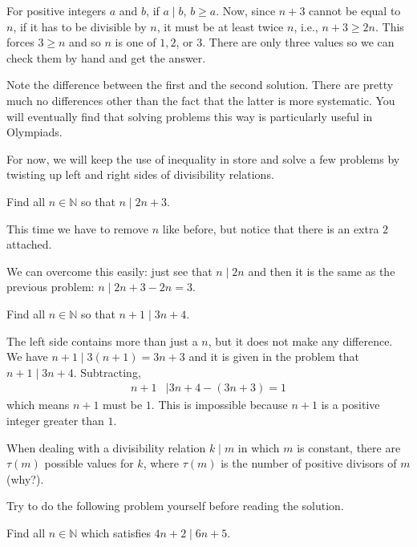 \documentclass{subfile}
\begin{document}
		\begin{solution}
			For positive integers $a$ and $b$, if $a\mid b$, $b\geq a$. Now, since $n+3$ cannot be equal to $n$, if it has to be divisible by $n$, it must be at least twice $n$, i.e., $n+3\geq2n$. This forces $3\geq n$ and so $n$ is one of $1,2$, or $3$. There are only three values so we can check them by hand and get the answer.
		\end{solution}
	Note the difference between the first and the second solution. There are pretty much no differences other than the fact that the latter is more systematic. You will eventually find that solving problems this way is particularly useful in Olympiads.

	For now, we will keep the use of inequality in store and solve a few problems by twisting up left and right sides of divisibility relations.
		\begin{problem}
			Find all $n \in \mathbb{N}$ so that $n\mid 2n+3$.
		\end{problem}

		\begin{solution}
			This time we have to remove $n$ like before, but notice that there is an extra $2$ attached.

			We can overcome this easily: just see that $n\mid 2n$ and then it is the same as the previous problem: $n\mid 2n+3-2n=3$.
		\end{solution}

		\begin{problem}
			Find all $n \in \mathbb{N}$ so that $n+1\mid 3n+4$.
		\end{problem}

		\begin{solution}
			The left side contains more than just a $n$, but it does not make any difference. We have $n+1 \mid 3(n+1)=3n+3$ and it is given in the problem that $n+1 \mid 3n+4$. Subtracting,
				\begin{align*}
					n+1
						&\mid 3n+4-(3n+3)=1
				\end{align*}
			which means $n+1$ must be $1$. This is impossible because $n+1$ is a positive integer greater than $1$.
		\end{solution}

		\begin{note}
			When dealing with a divisibility relation $k\mid m$ in which $m$ is constant, there are $\tau(m)$ possible values for $k$, where $\tau(m)$ is the number of positive divisors of $m$ (why?).
		\end{note}
	Try to do the following problem yourself before reading the solution.
		\begin{problem}
			Find all $n\in\mathbb{N}$ which satisfies $4n+2\mid 6n+5$.
		\end{problem}
\end{document}
